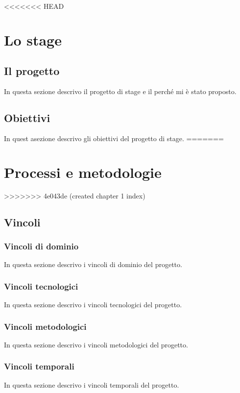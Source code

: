 
<<<<<<< HEAD
\chapter{Lo stage}
\label{cap:stage}
\section{Il progetto}
In questa sezione descrivo il progetto di stage e il perché mi è stato proposto. 

\section{Obiettivi}
In quest asezione descrivo gli obiettivi del progetto di stage.
=======
\chapter{Processi e metodologie}
\label{cap:processi-metodologie}
>>>>>>> 4e043de (created chapter 1 index)

\section{Vincoli}

\subsection{Vincoli di dominio}
In questa sezione descrivo i vincoli di dominio del progetto.

\subsection{Vincoli tecnologici}
In questa sezione descrivo i vincoli tecnologici del progetto.

\subsection{Vincoli metodologici}
In questa sezione descrivo i vincoli metodologici del progetto.

\subsection{Vincoli temporali}
In questa sezione descrivo i vincoli temporali del progetto.